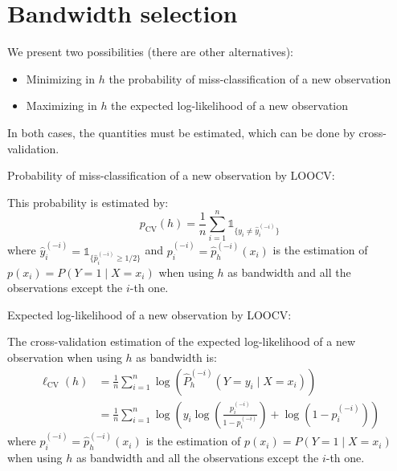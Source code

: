\pagebreak
\section{Bandwidth selection}
We present two possibilities (there are other alternatives):
\begin{itemize}
    \item Minimizing in $h$ the probability of miss-classification of a new observation
    \item Maximizing in $h$ the expected log-likelihood of a new observation
\end{itemize}
In both cases, the quantities must be estimated, which can be done by cross-validation.

\begin{definition}{Probability of miss-classification}{} of a new observation
    by LOOCV:

    This probability is estimated by:
    \begin{equation*}
        p_\text{CV}(h) = \frac{1}{n} \sum_{i = 1}^n \mathds{1}_{\{y_i \neq \hat{y}_i^{(-i)}\}}
    \end{equation*}
    where $\hat{y}_i^{(-i)} = \mathds{1}_{\{\hat{p}_i^{(-i)} \geq 1/2\}}$ and
    $p_i^{(-i)} = \hat p_h^{(-i)}(x_i)$ is the estimation of
    $p(x_i) = P(Y = 1 \mid X = x_i)$ when using $h$ as bandwidth and all the observations
    except the $i$-th one.
\end{definition}

\begin{definition}{Expected log-likelihood}{} of a new observation by LOOCV:

    The cross-validation estimation of the expected log-likelihood of
    a new observation when using $h$ as bandwidth is:
    \begin{align*}
        \ell_\text{CV}(h) &= \frac{1}{n} \sum_{i = 1}^n \log\left(
            \widehat{P}_h^{(-i)}(Y = y_i \mid X = x_i)
        \right) \\
                          &= \frac{1}{n} \sum_{i = 1}^n \log\left(
                              y_i \log\left(
                                  \frac{{p}_i^{(-i)}}{1 - {p}_i^{(-i)}}
                              \right) + \log\left(1 - {p}_i^{(-i)}\right)
                          \right)
    \end{align*}
    where ${p}_i^{(-i)} = \hat p_h^{(-i)}(x_i)$ is the estimation of
    $p(x_i) = P(Y = 1 \mid X = x_i)$ when using $h$ as bandwidth and all the observations
    except the $i$-th one.
\end{definition}
